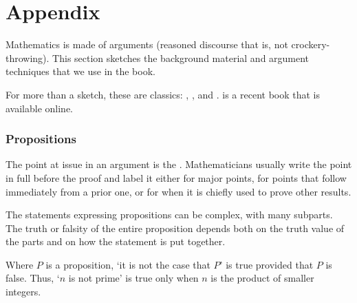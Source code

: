 %
%


\newcommand{\appendsection}[1]{\subsection*{#1}
   \addcontentsline{toc}{subsection}{#1}}
\markboth{}{}
\renewcommand{\thepage}{A-\arabic{page}}
\setcounter{page}{1}
\chapter*{Appendix}

Mathematics is made of arguments (reasoned discourse that is,
not crockery-throwing).
This section sketches the background material and 
argument techniques that we use in the book.

For more than a sketch, these are classics:
\cite{MathematicsPlausReason}, 
\cite{Quine},
and
\cite{NaiveSetThy}.
\cite{Beck} is
a recent book that is available online.




\appendsection{Propositions}
%
The point at issue in an argument is the 
.
Mathematicians usually write the point in full before the proof
and label it either
for major points,
for points that follow immediately from
a prior one, or 
for when it is chiefly used to prove other results.

The statements expressing propositions can be complex, with many subparts.
The truth or falsity of the entire proposition depends both on the
truth value of the parts and on how the statement is
put together.

Where \( P \) is a proposition,
`it is not the case that \( P \)' is true provided that \( P \) is
false.
Thus, `\( n \) is not prime' is true only when \( n \) is the
product of smaller integers.

